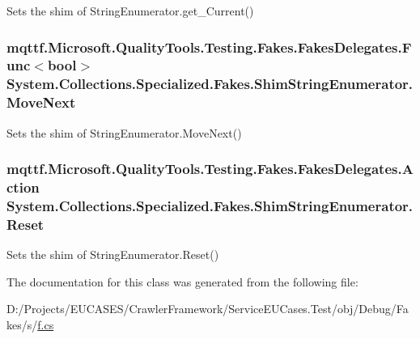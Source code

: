 Sets the shim of String\-Enumerator.\-get\-\_\-\-Current()

\hypertarget{class_system_1_1_collections_1_1_specialized_1_1_fakes_1_1_shim_string_enumerator_ac227e3f22bba13cff4078c85d4d85f96}{
\subsubsection[{Move\-Next}]{\setlength{\rightskip}{0pt plus 5cm}mqttf.\-Microsoft.\-Quality\-Tools.\-Testing.\-Fakes.\-Fakes\-Delegates.\-Func$<$bool$>$ System.\-Collections.\-Specialized.\-Fakes.\-Shim\-String\-Enumerator.\-Move\-Next\hspace{0.3cm}{\ttfamily [set]}}}\label{class_system_1_1_collections_1_1_specialized_1_1_fakes_1_1_shim_string_enumerator_ac227e3f22bba13cff4078c85d4d85f96}


Sets the shim of String\-Enumerator.\-Move\-Next()

\hypertarget{class_system_1_1_collections_1_1_specialized_1_1_fakes_1_1_shim_string_enumerator_af088edc05dfaecd2f03e5e72708ba0a2}{
\subsubsection[{Reset}]{\setlength{\rightskip}{0pt plus 5cm}mqttf.\-Microsoft.\-Quality\-Tools.\-Testing.\-Fakes.\-Fakes\-Delegates.\-Action System.\-Collections.\-Specialized.\-Fakes.\-Shim\-String\-Enumerator.\-Reset\hspace{0.3cm}{\ttfamily [set]}}}\label{class_system_1_1_collections_1_1_specialized_1_1_fakes_1_1_shim_string_enumerator_af088edc05dfaecd2f03e5e72708ba0a2}


Sets the shim of String\-Enumerator.\-Reset()



The documentation for this class was generated from the following file\-:\begin{DoxyCompactItemize}
\item 
D\-:/\-Projects/\-E\-U\-C\-A\-S\-E\-S/\-Crawler\-Framework/\-Service\-E\-U\-Cases.\-Test/obj/\-Debug/\-Fakes/s/\hyperlink{s_2f_8cs}{f.\-cs}\end{DoxyCompactItemize}
